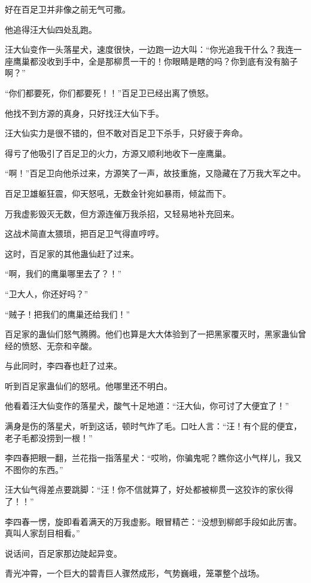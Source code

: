 
\begin{this_body}

好在百足卫并非像之前无气可撒。

他追得汪大仙四处乱跑。

汪大仙变作一头落星犬，速度很快，一边跑一边大叫：“你光追我干什么？我连一座鹰巢都没收到手中，全是那柳贯一干的！你眼睛是瞎的吗？你到底有没有脑子啊？”

“你们都要死，你们都要死！！”百足卫已经出离了愤怒。

他找不到方源的真身，只好找汪大仙下手。

汪大仙实力是很不错的，但不敢对百足卫下杀手，只好疲于奔命。

得亏了他吸引了百足卫的火力，方源又顺利地收下一座鹰巢。

“啊！”百足卫向他杀过来，方源笑了一声，故技重施，又隐藏在了万我大军之中。

百足卫雄躯狂震，仰天怒吼，无数金针宛如暴雨，倾盆而下。

万我虚影毁灭无数，但方源连催万我杀招，又轻易地补充回来。

这战术简直太猥琐，把百足卫气得直哼哼。

这时，百足家的其他蛊仙赶了过来。

“啊，我们的鹰巢哪里去了？！”

“卫大人，你还好吗？”

“贼子！把我们的鹰巢还给我们！”

百足家的蛊仙们怒气腾腾。他们也算是大大体验到了一把黑家覆灭时，黑家蛊仙曾经的愤怒、无奈和辛酸。

与此同时，李四春也赶了过来。

听到百足家蛊仙们的怒吼。他哪里还不明白。

他看着汪大仙变作的落星犬，酸气十足地道：“汪大仙，你可讨了大便宜了！”

满身是伤的落星犬，听到这话，顿时气炸了毛。口吐人言：“汪！有个屁的便宜，老子毛都没捞到一根！”

李四春把眼一翻，兰花指一指落星犬：“哎哟，你骗鬼呢？瞧你这小气样儿，我又不图你的东西。”

汪大仙气得差点要跳脚：“汪！你不信就算了，好处都被柳贯一这狡诈的家伙得了！！”

李四春一愣，旋即看着满天的万我虚影。眼冒精芒：“没想到柳郎手段如此厉害。真叫人家刮目相看。”

说话间，百足家那边陡起异变。

青光冲霄，一个巨大的碧青巨人骤然成形，气势巍峨，笼罩整个战场。


\end{this_body}

